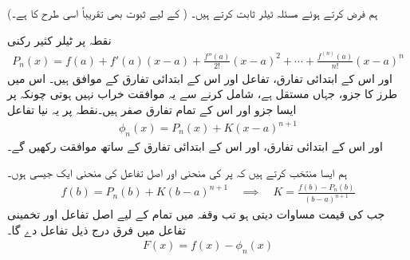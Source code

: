 ہم  فرض کرتے ہوئے مسئلہ ٹیلر ثابت کرتے ہیں۔ ( کے لیے  ثبوت  بھی  تقریباً اسی طرح کا ہے۔)

نقطہ  پر ٹیلر کثیر رکنی
\begin{align*}
P_n(x)=f(a)+f'(a)(x-a)+\frac{f''(a)}{2!}(x-a)^2+\cdots+\frac{f^{(n)}(a)}{n!}(x-a)^n
\end{align*}
اور اس کے ابتدائی  تفارق، تفاعل  اور اس کے ابتدائی  تفارق کے موافق ہیں۔ اس میں  طرز کا جزو، جہاں  مستقل ہے، شامل کرنے سے یہ موافقت خراب نہیں ہوتی چونکہ   پر ایسا جزو اور اس کے تمام تفارق صفر ہیں۔نقطہ  پر یہ نیا تفاعل
\begin{align*}
\phi_n(x)=P_n(x)+K(x-a)^{n+1}
\end{align*}
اور اس کے ابتدائی  تفارق،  اور اس کے ابتدائی  تفارق کے ساتھ موافقت رکھیں گے۔

ہم ایسا   منتخب کرتے ہیں کہ  پر  کی منحنی اور اصل تفاعل  کی منحنی ایک  جیسی ہوں۔
\begin{align}\label{مساوات_تسلسل_کے_کی_قیمت}
f(b)=P_n(b)+K(b-a)^{n+1}\quad \implies \quad K=\frac{f(b)-P_n(b)}{(b-a)^{n+1}}
\end{align}
جب  کی قیمت مساوات  دیتی ہو تب وقفہ  میں تمام  کے لیے اصل تفاعل  اور تخمینی تفاعل  میں فرق درج ذیل تفاعل دے گا۔
\begin{align*}
F(x)=f(x)-\phi_n(x)
\end{align*}

